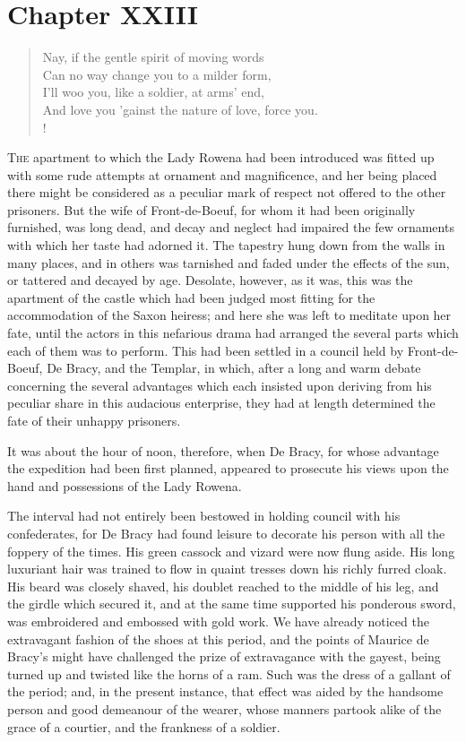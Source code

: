 \chapter{Chapter XXIII}

\begin{verse}
Nay, if the gentle spirit of moving words\\
Can no way change you to a milder form,\\
I'll woo you, like a soldier, at arms' end,\\
And love you 'gainst the nature of love, force you.\\!
\end{verse}

\lettrine{T}{he} apartment to which the Lady Rowena had been introduced
was fitted up
with some rude attempts at ornament and magnificence, and her being
placed there might be considered as a peculiar mark of respect not
offered to the other prisoners. But the wife of Front-de-Boeuf, for whom
it had been originally furnished, was long dead, and decay and neglect
had impaired the few ornaments with which her taste had adorned it. The
tapestry hung down from the walls in many places, and in others was
tarnished and faded under the effects of the sun, or tattered and
decayed by age. Desolate, however, as it was, this was the apartment of
the castle which had been judged most fitting for the accommodation of
the Saxon heiress; and here she was left to meditate upon her fate,
until the actors in this nefarious drama had arranged the several parts
which each of them was to perform. This had been settled in a council
held by Front-de-Boeuf, De Bracy, and the Templar, in which, after a
long and warm debate concerning the several advantages which each
insisted upon deriving from his peculiar share in this audacious
enterprise, they had at length determined the fate of their unhappy
prisoners.

It was about the hour of noon, therefore, when De Bracy, for whose
advantage the expedition had been first planned, appeared to prosecute
his views upon the hand and possessions of the Lady Rowena.

The interval had not entirely been bestowed in holding council with his
confederates, for De Bracy had found leisure to decorate his person with
all the foppery of the times. His green cassock and vizard were now
flung aside. His long luxuriant hair was trained to flow in quaint
tresses down his richly furred cloak. His beard was closely shaved, his
doublet reached to the middle of his leg, and the girdle which secured
it, and at the same time supported his ponderous sword, was embroidered
and embossed with gold work. We have already noticed the extravagant
fashion of the shoes at this period, and the points of Maurice de
Bracy's might have challenged the prize of extravagance with the gayest,
being turned up and twisted like the horns of a ram. Such was the dress
of a gallant of the period; and, in the present instance, that effect
was aided by the handsome person and good demeanour of the wearer, whose
manners partook alike of the grace of a courtier, and the frankness of a
soldier.

